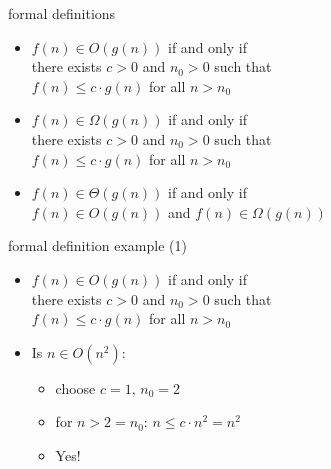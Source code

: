 \begin{frame}{formal definitions}
    \begin{itemize}
    \item $f(n) \in O(g(n))$ if and only if \\
        \hspace{.5cm}there exists $c > 0$ and $n_0 > 0$ such that \\
            \hspace{.5cm}$f(n) \le c \cdot g(n)$ for all $n > n_0$
    \item $f(n) \in \Omega(g(n))$ if and only if \\
        \hspace{.5cm}there exists $c > 0$ and $n_0 > 0$ such that \\
        \hspace{.5cm}$f(n) \le c \cdot g(n)$ for all $n > n_0$
    \item $f(n) \in \Theta(g(n))$ if and only if \\
          $f(n) \in O(g(n))$ and $f(n) \in \Omega(g(n))$
    \end{itemize}
\end{frame}

\begin{frame}{formal definition example (1)}
    \begin{itemize}
    \item $f(n) \in O(g(n))$ if and only if \\
        \hspace{.5cm}there exists $c > 0$ and $n_0 > 0$ such that \\
        \hspace{.5cm}$f(n) \le c \cdot g(n)$ for all $n > n_0$
    \item Is $ n \in O(n^2)$:
        \begin{itemize}
        \item<2-> choose $c = 1$, $n_0 = 2$
        \item<2-> for $n > 2=n_0$: $n \le c\cdot n^2 = n^2$
        \item<2-> Yes!
        \end{itemize}
    \end{itemize}
\end{frame}

